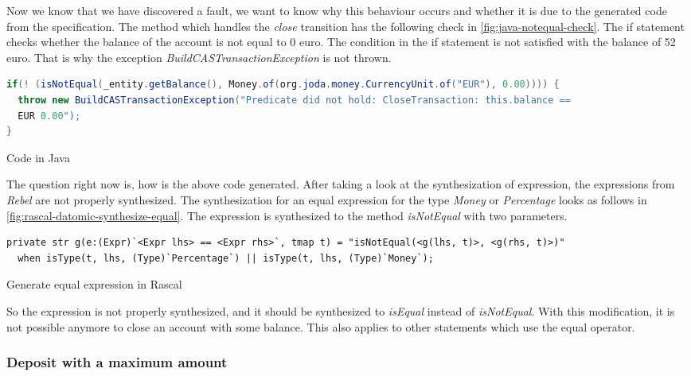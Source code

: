 Now we know that we have discovered a fault, we want to know why this behaviour
occurs and whether it is due to the generated code from the specification. The
method which handles the \textit{close} transition has the following check in
\autoref{fig:java-notequal-check}. The if statement checks whether the balance
of the account is not equal to 0 euro. The condition in the if statement is not
satisfied with the balance of 52 euro. That is why the exception
\textit{BuildCASTransactionException} is not thrown.

\begin{sourcecode}[h!]
\begin{lstlisting}[language=Java]
if(! (isNotEqual(_entity.getBalance(), Money.of(org.joda.money.CurrencyUnit.of("EUR"), 0.00)))) {
  throw new BuildCASTransactionException("Predicate did not hold: CloseTransaction: this.balance ==
  EUR 0.00");
}
\end{lstlisting}
\caption{Code in Java}\label{fig:java-notequal-check}
\end{sourcecode}
\FloatBarrier

The question right now is, how is the above code generated. After taking a look at the synthesization of
expression, the expressions from \textit{Rebel} are not properly synthesized. The
synthesization for an equal expression for the type \textit{Money} or \textit{Percentage} looks as
follows in \autoref{fig:rascal-datomic-synthesize-equal}. The expression is
synthesized to the method \textit{isNotEqual} with two parameters.

\begin{sourcecode}[h!]
\begin{lstlisting}[]
private str g(e:(Expr)`<Expr lhs> == <Expr rhs>`, tmap t) = "isNotEqual(<g(lhs, t)>, <g(rhs, t)>)"
  when isType(t, lhs, (Type)`Percentage`) || isType(t, lhs, (Type)`Money`);
\end{lstlisting}
\caption{Generate equal expression in Rascal}\label{fig:rascal-datomic-synthesize-equal}
\end{sourcecode}
\FloatBarrier

So the expression is not properly synthesized, and it should be synthesized to
\textit{isEqual} instead of \textit{isNotEqual}. With this modification, it
is not possible anymore to close an account with some balance. This also applies
to other statements which use the equal operator.

\subsubsection{Deposit with a maximum amount}\label{sec:bug-compile-max-deposit}

